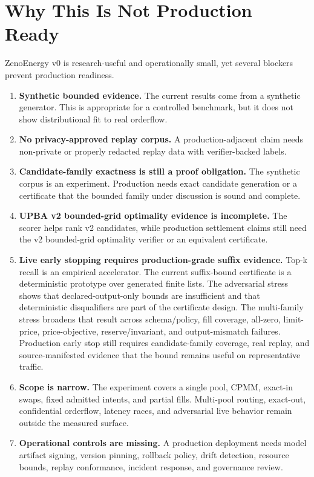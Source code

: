 \documentclass[11pt]{article}
\begin{document}
\section{Why This Is Not Production Ready}

ZenoEnergy v0 is research-useful and operationally small, yet several blockers
prevent production readiness.

\begin{enumerate}[leftmargin=*]
\item \textbf{Synthetic bounded evidence.} The current results come from a
synthetic generator. This is appropriate for a controlled benchmark, but it does
not show distributional fit to real orderflow.
\item \textbf{No privacy-approved replay corpus.} A production-adjacent claim
needs non-private or properly redacted replay data with verifier-backed labels.
\item \textbf{Candidate-family exactness is still a proof obligation.} The
synthetic corpus is an experiment. Production needs exact candidate generation
or a certificate that the bounded family under discussion is sound and complete.
\item \textbf{UPBA v2 bounded-grid optimality evidence is incomplete.} The
scorer helps rank v2 candidates, while production settlement claims still need
the v2 bounded-grid optimality verifier or an equivalent certificate.
\item \textbf{Live early stopping requires production-grade suffix evidence.}
Top-k recall is an empirical accelerator. The current suffix-bound certificate
is a deterministic prototype over generated finite lists. The adversarial
stress shows that declared-output-only bounds are insufficient and that
deterministic disqualifiers are part of the certificate design. The
multi-family stress broadens that result across schema/policy, fill coverage,
all-zero, limit-price, price-objective, reserve/invariant, and output-mismatch
failures. Production early stop still requires candidate-family coverage, real
replay, and source-manifested evidence that the bound remains useful on
representative traffic.
\item \textbf{Scope is narrow.} The experiment covers a single pool, CPMM,
exact-in swaps, fixed admitted intents, and partial fills. Multi-pool routing,
exact-out, confidential orderflow, latency races, and adversarial live behavior
remain outside the measured surface.
\item \textbf{Operational controls are missing.} A production deployment needs
model artifact signing, version pinning, rollback policy, drift detection,
resource bounds, replay conformance, incident response, and governance review.
\end{enumerate}
\end{document}
